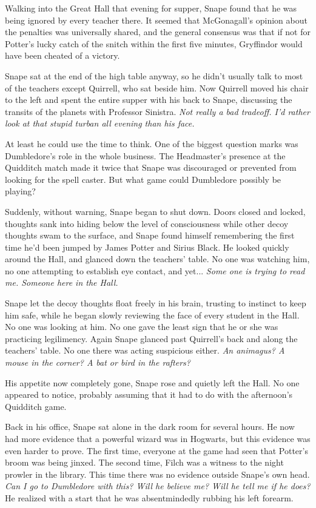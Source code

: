 \documentclass[a4paper,11pt]{article}
\begin{document}
Walking into the Great Hall that evening for supper, Snape found that he was being ignored by every teacher there. It seemed that McGonagall's opinion about the penalties was universally shared, and the general consensus was that if not for Potter's lucky catch of the snitch within the first five minutes, Gryffindor would have been cheated of a victory.

Snape sat at the end of the high table anyway, so he didn't usually talk to most of the teachers except Quirrell, who sat beside him. Now Quirrell moved his chair to the left and spent the entire supper with his back to Snape, discussing the transits of the planets with Professor Sinistra. \emph{Not really a bad tradeoff. I'd rather look at that stupid turban all evening than his face.}

At least he could use the time to think. One of the biggest question marks was Dumbledore's role in the whole business. The Headmaster's presence at the Quidditch match made it twice that Snape was discouraged or prevented from looking for the spell caster. But what game could Dumbledore possibly be playing?

Suddenly, without warning, Snape began to shut down. Doors closed and locked, thoughts sank into hiding below the level of consciousness while other decoy thoughts swam to the surface, and Snape found himself remembering the first time he'd been jumped by James Potter and Sirius Black. He looked quickly around the Hall, and glanced down the teachers' table. No one was watching him, no one attempting to establish eye contact, and yet... \emph{Some one is trying to read me. Someone here in the Hall.}

Snape let the decoy thoughts float freely in his brain, trusting to instinct to keep him safe, while he began slowly reviewing the face of every student in the Hall. No one was looking at him. No one gave the least sign that he or she was practicing legilimency. Again Snape glanced past Quirrell's back and along the teachers' table. No one there was acting suspicious either. \emph{An animagus? A mouse in the corner? A bat or bird in the rafters?}

His appetite now completely gone, Snape rose and quietly left the Hall. No one appeared to notice, probably assuming that it had to do with the afternoon's Quidditch game.

Back in his office, Snape sat alone in the dark room for several hours. He now had more evidence that a powerful wizard was in Hogwarts, but this evidence was even harder to prove. The first time, everyone at the game had seen that Potter's broom was being jinxed. The second time, Filch was a witness to the night prowler in the library. This time there was no evidence outside Snape's own head. \emph{Can I go to Dumbledore with this? Will he believe me? Will he tell me if he does?} He realized with a start that he was absentmindedly rubbing his left forearm.
\end{document}
